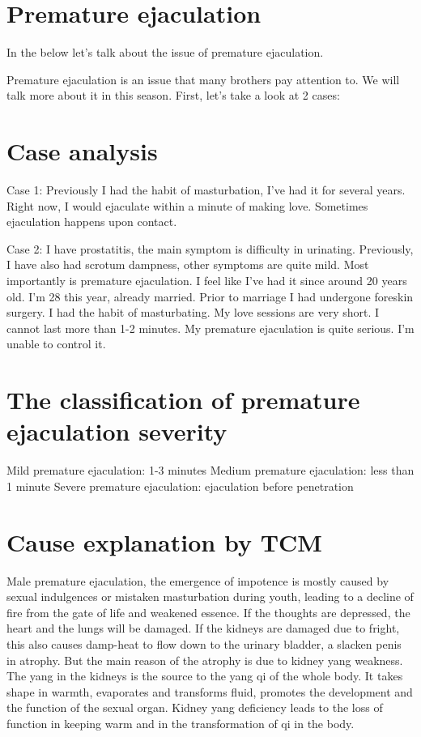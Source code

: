 \documentclass[
]{book}
\begin{document}
\hypertarget{premature-ejaculation}{%
\section{Premature ejaculation}\label{premature-ejaculation}}

In the below let's talk about the issue of premature ejaculation.

Premature ejaculation is an issue that many brothers pay attention to. We will talk more about it in this season. First, let's take a look at 2 cases:

\hypertarget{case-analysis}{%
\section{Case analysis}\label{case-analysis}}

Case 1: Previously I had the habit of masturbation, I've had it for several years. Right now, I would ejaculate within a minute of making love. Sometimes ejaculation happens upon contact.

Case 2: I have prostatitis, the main symptom is difficulty in urinating. Previously, I have also had scrotum dampness, other symptoms are quite mild. Most importantly is premature ejaculation. I feel like I've had it since around 20 years old. I'm 28 this year, already married. Prior to marriage I had undergone foreskin surgery. I had the habit of masturbating. My love sessions are very short. I cannot last more than 1-2 minutes. My premature ejaculation is quite serious. I'm unable to control it.

\hypertarget{the-classification-of-premature-ejaculation-severity}{%
\section{The classification of premature ejaculation severity}\label{the-classification-of-premature-ejaculation-severity}}

Mild premature ejaculation: 1-3 minutes
Medium premature ejaculation: less than 1 minute
Severe premature ejaculation: ejaculation before penetration

\hypertarget{cause-explanation-by-tcm}{%
\section{Cause explanation by TCM}\label{cause-explanation-by-tcm}}

Male premature ejaculation, the emergence of impotence is mostly caused by sexual indulgences or mistaken masturbation during youth, leading to a decline of fire from the gate of life and weakened essence. If the thoughts are depressed, the heart and the lungs will be damaged. If the kidneys are damaged due to fright, this also causes damp-heat to flow down to the urinary bladder, a slacken penis in atrophy. But the main reason of the atrophy is due to kidney yang weakness. The yang in the kidneys is the source to the yang qi of the whole body. It takes shape in warmth, evaporates and transforms fluid, promotes the development and the function of the sexual organ. Kidney yang deficiency leads to the loss of function in keeping warm and in the transformation of qi in the body.
\end{document}
